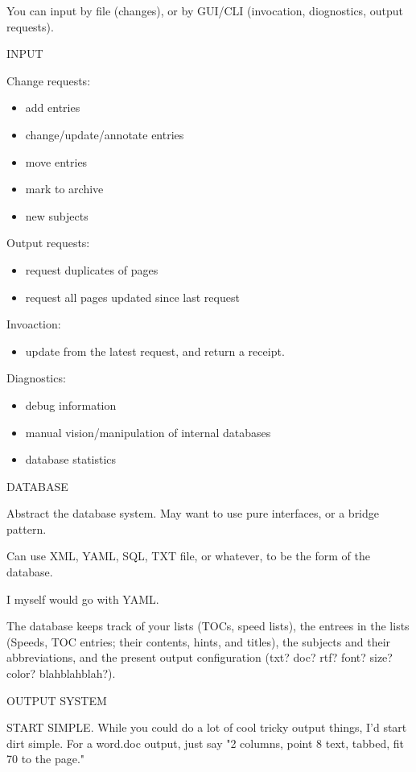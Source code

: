 \documentclass[oneside]{scrbook}
\begin{document}
You can input by file (changes), or by GUI/CLI (invocation,
diognostics, output requests).


INPUT

Change requests:
\begin{itemize}
\item add entries
\item change/update/annotate entries
\item move entries
\item mark to archive
\item new subjects
\end{itemize}

Output requests:
\begin{itemize}
\item request duplicates of pages
\item request all pages updated since last request
\end{itemize}

Invoaction:
\begin{itemize}
\item update from the latest request, and return a receipt.
\end{itemize}

Diagnostics:
\begin{itemize}
\item debug information
\item manual vision/manipulation of internal databases
\item database statistics
\end{itemize}


DATABASE

Abstract the database system.
May want to use pure interfaces, or a bridge pattern.

Can use XML, YAML, SQL, TXT file, or whatever, to be the form of the
database.

I myself would go with YAML.

The database keeps track of your lists (TOCs, speed lists), the
entrees in the lists (Speeds, TOC entries; their contents, hints, and
titles), the subjects and their abbreviations, and the present output
configuration (txt? doc? rtf? font? size? color? blahblahblah?).


OUTPUT SYSTEM

START SIMPLE. While you could do a lot of cool tricky output things,
I'd start dirt simple. For a word.doc output, just say "2 columns,
point 8 text, tabbed, fit 70 to the page."
\end{document}
